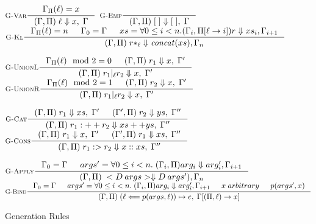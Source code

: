 \begin{figure}\footnotesize
\begin{center}
      $\inference
         [\RuleVariable]
         {\envget{\lab} = x}
         {\inp \lab \gens x, \zout}$
      $\inference
         [\RuleEmpty]
         {}
         {\inp \nil \gens \nil, \zout}$
      $\inference
         [\RuleStar]
         { \envget{\lab} = n
            & \env_0 = \env
            & xs = \forall 0 \leq i < n . (\env_{i}, \pathput{\lab}{i}) r \gens xs_{i}, \env_{i + 1}
         }
         {\inp r*_{\lab} \gens \foldconcat{xs}, \env_{n}}$

      $\inference
         [\RuleUnionLeft]
         {\envget{\lab} \mod 2 = 0 & \inp r_1 \gens x, \out}
         {\inp r_1 |_{\lab} r_2 \gens x, \out}$
      $\inference
         [\RuleUnionRight]
         {\envget{\lab} \mod 2 = 1 & \inp r_2 \gens x, \out}
         {\inp r_1 |_{\lab} r_2 \gens x, \out}$


      $\inference
         [\RuleConcat]
         {\inp r_1 \gens xs, \out & \dinp r_2 \gens ys, \dout}
         {\inp r_{1} \concat r_{2} \gens xs \append ys, \dout}$
      $\inference
         [\RuleCons]
         {\inp r_1 \gens x, \out & \dinp r_1 \gens xs, \dout}
         {\inp r_{1} \cons r_{2} \gens x \ccons xs, \dout}$

      $\inference
         [\RuleApply]
         {\env_0 = \env
            & args' = \forall 0 \leq i < n. \; (\env_i, \pathvar) arg_i \gens arg'_i, \env_{i + 1}}
         {\inp <\dc \; args> \gens \dc(args'), \env_n}$
      $\inference
         [\RuleAssign]
         {
            \env_0 = \env
            & args' = \forall 0 \leq i < n. \; (\env_i, \pathvar) arg_i \gens arg'_i, \env_{i + 1}
            & \arbitrary{x} & p(args', x)}
         {\inp (\lab \Longleftarrow p(args, \lab)) \mapsto e, \outw{\lab}{x}}$
    \caption{Generation Rules}
    \label{fig:generation-rules}
\end{center}
\end{figure}
